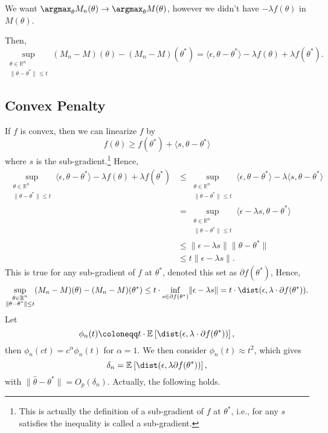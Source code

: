 \begin{remark}
	We want \(\argmax_{\theta } M_n(\theta ) \to \argmax_{\theta } M(\theta )\), however we didn't have \(-\lambda f(\theta )\) in \(M(\theta )\).
\end{remark}

Then,
\[
	\sup _{\substack{\theta \in \mathbb{R} ^n \\ \lVert \theta - \theta ^{\ast}  \rVert \leq t }} (M_n - M)(\theta ) - (M_n - M)(\theta ^{\ast} )
	= \langle \epsilon , \theta - \theta ^{\ast}  \rangle - \lambda f(\theta ) + \lambda f(\theta ^{\ast} ).
\]

\subsection{Convex Penalty}
If \(f\) is convex, then we can linearize \(f\) by
\[
	f(\theta ) \geq f(\theta ^{\ast} ) + \langle s, \theta - \theta ^{\ast}  \rangle
\]
where \(s\) is the sub-gradient.\footnote{This is actually the definition of a sub-gradient of \(f\) at \(\theta ^{\ast} \), i.e., for any \(s\) satisfies the inequality is called a sub-gradient.} Hence,
\[
	\begin{split}
		\sup _{\substack{\theta \in \mathbb{R} ^n                                         \\ \lVert \theta - \theta ^{\ast}  \rVert \leq t }} \langle \epsilon , \theta - \theta ^{\ast}  \rangle - \lambda f(\theta ) + \lambda f(\theta ^{\ast} )
		 & \leq \sup _{\substack{\theta \in \mathbb{R} ^n                                 \\ \lVert \theta - \theta ^{\ast}  \rVert \leq t }} \langle \epsilon , \theta - \theta ^{\ast}  \rangle - \lambda \langle s, \theta - \theta ^{\ast}  \rangle \\
		 & = \sup _{\substack{\theta \in \mathbb{R} ^n                                    \\ \lVert \theta - \theta ^{\ast}  \rVert \leq t }} \langle \epsilon - \lambda s, \theta - \theta ^{\ast}  \rangle \\
		 & \leq \lVert \epsilon - \lambda s \rVert \lVert \theta - \theta ^{\ast}  \rVert \\
		 & \leq t \lVert \epsilon - \lambda s \rVert .
	\end{split}
\]
This is true for any sub-gradient of \(f\) at \(\theta ^{\ast} \), denoted this set as \(\partial f(\theta ^{\ast} )\), Hence,
\[
	\sup _{\substack{\theta \in \mathbb{R} ^n \\ \lVert \theta - \theta ^{\ast}  \rVert \leq t }} (M_n - M)(\theta ) - (M_n - M)(\theta ^{\ast} )
	\leq t \cdot \inf _{s\in \partial f(\theta ^{\ast} )} \lVert \epsilon - \lambda s \rVert
	= t \cdot \dist(\epsilon , \lambda \cdot \partial f(\theta ^{\ast} )) .
\]
Let
\[
	\phi _n(t) \coloneqq t \cdot \mathbb{E}_{}\left[\dist(\epsilon , \lambda \cdot \partial f(\theta ^{\ast} ))  \right] ,
\]
then \(\phi _n(ct) = c^\alpha \phi _n(t)\) for \(\alpha = 1\). We then consider \(\phi _n(t) \approx t^2\), which gives
\[
	\delta _n = \mathbb{E}_{}\left[\dist(\epsilon , \lambda \partial f(\theta ^{\ast} ))  \right] ,
\]
with \(\lVert \hat{\theta} - \theta ^{\ast}  \rVert = O_p(\delta _n)\). Actually, the following holds.

